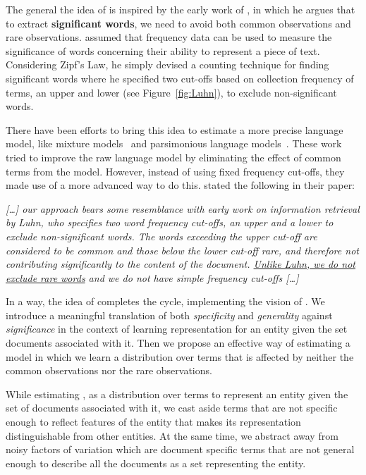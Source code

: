 The general the idea of \acswlm is inspired by the early work of \citet{Luhn:1958}, in which he argues that to extract \textbf{significant words}, we need to avoid both common observations and rare observations. \citeauthor{Luhn:1958} assumed that frequency data can be used to measure the significance of words concerning their ability to represent a piece of text.  Considering Zipf's Law, he simply devised a counting technique for finding significant words where he specified two cut-offs based on collection frequency of terms, an upper and lower (see Figure~\ref{fig:Luhn}), to exclude non-significant words.

There have been efforts to bring this idea to estimate a more precise language model, like mixture models~\citep{Zhai:SMM:2001} and parsimonious language models~\citep{Hiemstra:2004}. These work tried to improve the raw language model by eliminating the effect of common terms from the model. However, instead of using fixed frequency cut-offs, they made use of a more advanced way to do this. \citeauthor{Hiemstra:2004} stated the following in their paper:
\begin{displayquote}

\textsl{
[\ldots] our approach bears some resemblance with early work on information retrieval by Luhn, who specifies
two word frequency cut-offs, an upper and a lower to exclude non-significant words. 
The words exceeding the upper cut-off are considered to be common and those below the lower cut-off rare, and therefore not contributing significantly to the content of the document. \ul{Unlike Luhn, we do not exclude rare words} and we do not have simple frequency cut-offs [\ldots]}

\end{displayquote} 
In a way, the idea of \acswlm completes the cycle, implementing the vision of \citeauthor{Luhn:1958}.  We introduce a meaningful translation of both \textit{specificity} and \textit{generality} against \textit{significance} in the context of learning representation for an entity given the set documents associated with it. Then we propose an effective way of estimating a model in which we learn a distribution over terms that is affected by neither the common observations nor the rare observations. 
%

While estimating \acswlm, as a distribution over terms to represent an entity given the set of documents associated with it, we cast aside terms that are not specific enough to reflect features of the entity that makes its representation distinguishable from other entities. At the same time, we abstract away from noisy factors of variation which are document specific terms that are not general enough to describe all the documents as a set representing the entity.


